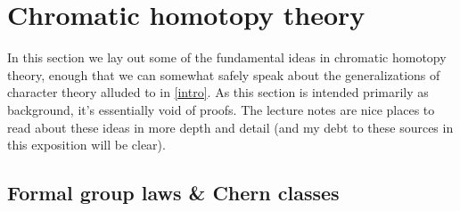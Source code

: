 \section{Chromatic homotopy theory}
\label{chrom}

\newcommand{\CP}{\lC\lP}

In this section we lay out some of the fundamental ideas in chromatic
homotopy theory, enough that we can somewhat safely speak about the
generalizations of character theory alluded to in \cref{intro}. As
this section is intended primarily as background, it's essentially
void of proofs. The lecture notes
\cite{hopkins-coctalos,lurie-chromatic} are nice places to read about
these ideas in more depth and detail (and my debt to these sources in
this exposition will be clear).

\subsection{Formal group laws \& Chern classes}

